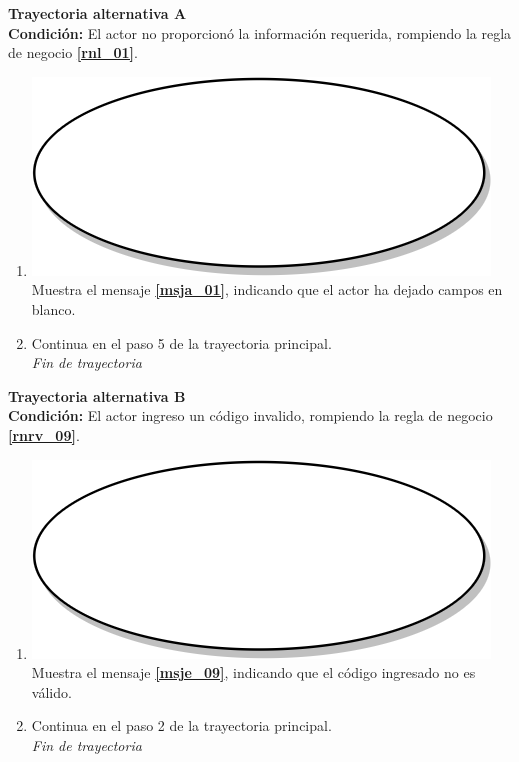 \textbf{Trayectoria alternativa A} \label{cu2_1_ta_a} \\
\textbf{Condición:} El actor no proporcionó la información requerida, rompiendo la regla de negocio \textbf{\ref{rnl_01}}.\\
 \begin{enumerate}[label=A\arabic*]
    \item {\includegraphics[scale=.05]{Capitulo3/img/proceso.png} Muestra el mensaje \textbf{\ref{msja_01}}, indicando que el actor ha dejado campos en blanco.}
    \item {Continua en el paso 5 de la trayectoria principal.} \\
    \textit{Fin de trayectoria} \\
\end{enumerate}

\textbf{Trayectoria alternativa B} \label{cu2_1_ta_b} \\
\textbf{Condición:} El actor ingreso un código invalido, rompiendo la regla de negocio \textbf{\ref{rnrv_09}}. \\
 \begin{enumerate}[label=\arabic*]
    \item {\includegraphics[scale=.05]{Capitulo3/img/proceso.png} Muestra el mensaje \textbf{\ref{msje_09}}, indicando que el código ingresado no es válido. }
    \item {Continua en el paso 2 de la trayectoria principal.} \\
    \textit{Fin de trayectoria} \\
\end{enumerate}

